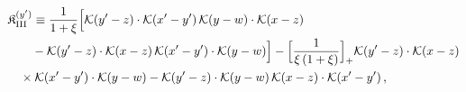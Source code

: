 \begingroup\small
\begin{align}\label{eq:K-y_rm_III}
&\mathfrak{K}^{(y')}_{\rm III}\equiv \frac{1}{1+\xi}\Big[\mathcal{K}(y'-z)\cdot\mathcal{K}(x'-y')\, \mathcal{K}(y-w)\cdot\mathcal{K}(x-z)\notag\\
&\quad\quad -\mathcal{K}(y'-z)\cdot\mathcal{K}(x-z)\, \mathcal{K}(x'-y')\cdot\mathcal{K}(y-w)\Big] -\Big[\frac{1}{\xi\,(1+\xi)}\Big]_{+}\mathcal{K}(y'-z)\cdot\mathcal{K}(x-z)\notag\\
&\quad \times \mathcal{K}(x'-y')\cdot\mathcal{K}(y-w) -\mathcal{K}(y'-z)\cdot\mathcal{K}(y-w)\, \mathcal{K}(x-z)\cdot\mathcal{K}(x'-y')\,,
\end{align}
\endgroup
